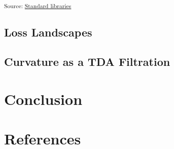 \documentclass[
  letterpaper,
  DIV=11,
  numbers=noendperiod]{scrartcl}
\theoremstyle{plain}
\theoremstyle{plain}
\theoremstyle{definition}
\theoremstyle{definition}
\theoremstyle{remark}
\begin{document}
\textsubscript{Source:
\href{https://professorwug.github.io/diffusion-curvature//home/piriac/Pumberton/Workshop/21-SUMRY-Curvature/diffusion-curvature/nbs/experiments/2f-sign-prediction-tests.ipynb.html\#cell-fig-sadspheres}{Standard
libraries}}

\subsection{Loss Landscapes}\label{loss-landscapes}

\subsection{Curvature as a TDA
Filtration}\label{curvature-as-a-tda-filtration}

\section{Conclusion}\label{conclusion}

\section*{References}\label{references}
\end{document}
